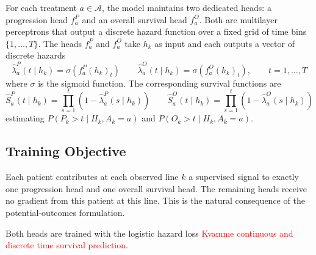 \documentclass[a4paper,10pt]{article}
\begin{document}
For each treatment $a \in \mathcal{A}$, the model maintains two dedicated heads: a progression head $f^P_a$ and an overall survival head $f^O_a$. Both are multilayer perceptrons that output a discrete hazard function over a fixed grid of time bins $\{1, \ldots, T\}$.
The heads $f^P_a$ and $f^O_a$ take $h_k$ as input and each outputs a vector of discrete hazards
\begin{equation}
    \hat{\lambda}^P_a(t \mid h_k) = \sigma\left( f^P_a(h_k)_t \right) \qquad
    \hat{\lambda}^O_a(t \mid h_k) = \sigma\left( f^O_a(h_k)_t \right)
    , \qquad t = 1, \ldots, T
\end{equation}
where $\sigma$ is the sigmoid function. The corresponding survival functions are
\begin{equation}
    \hat{S}^P_a(t \mid h_k) = \prod_{s=1}^{t} \left( 1 - \hat{\lambda}^P_a(s \mid h_k) \right) \qquad
    \hat{S}^O_a(t \mid h_k) = \prod_{s=1}^{t} \left( 1 - \hat{\lambda}^O_a(s \mid h_k) \right)
\end{equation}
estimating $P(P_k > t \mid H_k, A_k = a)$ and $P(O_k > t \mid H_k, A_k = a)$.

\subsection{Training Objective}
\label{sec:training}

Each patient contributes at each observed line $k$ a supervised signal to exactly one progression head and one overall survival head. The remaining heads receive no gradient from this patient at this line. This is the natural consequence of the potential-outcomes formulation.

Both heads are trained with the logistic hazard loss \textcolor{red}{Kvamme continuous and discrete time survival prediction}.
\end{document}
